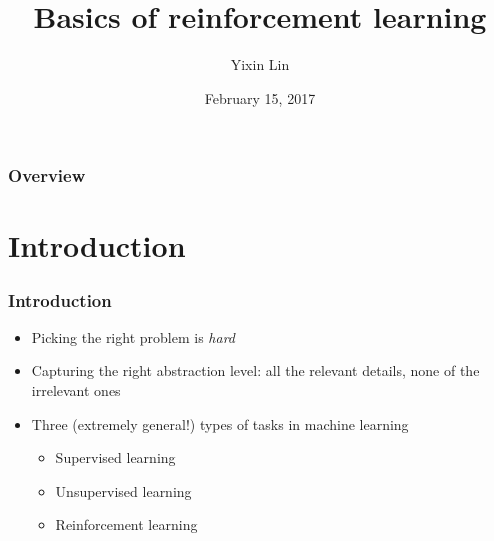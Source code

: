 \documentclass{beamer}
\title[Intro to RL]{Basics of reinforcement learning} %
\author{Yixin Lin} %
\institute[Duke] %
{
Duke University \\ %
\medskip
\textit{yixin.lin@duke.edu} %
}
\date{February 15, 2017} %
\begin{document}
\begin{frame}
\titlepage %
\end{frame}

\begin{frame}
\frametitle{Overview} %
\tableofcontents %
\end{frame}

\section{Introduction}

\begin{frame}
\frametitle{Introduction}
\begin{itemize}
  \item Picking the right problem is \textit{hard}
  \item Capturing the right abstraction level: all the relevant details, none of the irrelevant ones
  \item Three (extremely general!) types of tasks in machine learning
    \begin{itemize}
      \item Supervised learning
      \item Unsupervised learning
      \item Reinforcement learning
    \end{itemize}

\end{itemize}
\end{frame}
\end{document}
